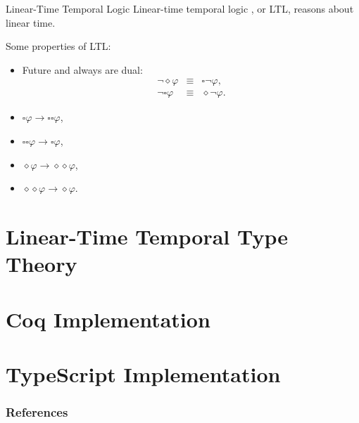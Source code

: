 \begin{frame}{Linear-Time Temporal Logic}
    Linear-time temporal logic \cite{DBLP:conf/focs/Pnueli77}, or LTL, reasons about linear time.
    
    Some properties of LTL:
    \begin{itemize}
        \item Future and always are dual:
        \begin{eqnarray*}
        \neg\diamond\varphi &\equiv& \square\neg\varphi, \\
        \neg\square\varphi &\equiv& \diamond\neg\varphi.
        \end{eqnarray*}
        \item $\square\varphi \rightarrow \square\square\varphi$,
        \item $\square\square\varphi \rightarrow \square\varphi$,
        \item $\diamond\varphi \rightarrow \diamond\diamond\varphi$, 
        \item $\diamond\diamond\varphi \rightarrow \diamond\varphi$.
    \end{itemize}
\end{frame}

\section{Linear-Time Temporal Type Theory}

\section{Coq Implementation}

\section{TypeScript Implementation}

\begin{frame}[t,allowframebreaks]
\nocite{*}
\frametitle{References}


\end{frame}
